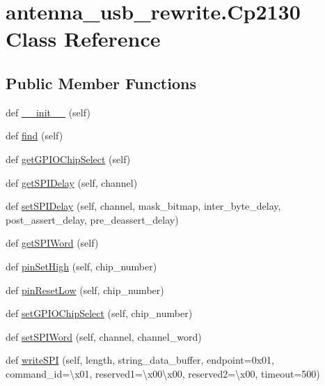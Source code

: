 \hypertarget{classantenna__usb__rewrite_1_1_cp2130}{}\section{antenna\+\_\+usb\+\_\+rewrite.\+Cp2130 Class Reference}
\label{classantenna__usb__rewrite_1_1_cp2130}
\subsection*{Public Member Functions}
\begin{DoxyCompactItemize}
\item 
def \hyperlink{classantenna__usb__rewrite_1_1_cp2130_ad9b0f559ad3acf15619ead6a841b3819}{\+\_\+\+\_\+init\+\_\+\+\_\+} (self)
\item 
def \hyperlink{classantenna__usb__rewrite_1_1_cp2130_aef000907558ea3f8a41eeefe44714b71}{find} (self)
\item 
def \hyperlink{classantenna__usb__rewrite_1_1_cp2130_a0392f11a0df0ea9765ebe864a1e54be5}{get\+G\+P\+I\+O\+Chip\+Select} (self)
\item 
def \hyperlink{classantenna__usb__rewrite_1_1_cp2130_a0710e28b89ee8f720546be8445b03dd4}{get\+S\+P\+I\+Delay} (self, channel)
\item 
def \hyperlink{classantenna__usb__rewrite_1_1_cp2130_a0903382e31257a0ee45510e3687f4d4f}{set\+S\+P\+I\+Delay} (self, channel, mask\+\_\+bitmap, inter\+\_\+byte\+\_\+delay, post\+\_\+assert\+\_\+delay, pre\+\_\+deassert\+\_\+delay)
\item 
def \hyperlink{classantenna__usb__rewrite_1_1_cp2130_a339cdd7e4a1073180be5c65eb9d0972b}{get\+S\+P\+I\+Word} (self)
\item 
def \hyperlink{classantenna__usb__rewrite_1_1_cp2130_a5eb2728116ba0685b7a182808bd2291f}{pin\+Set\+High} (self, chip\+\_\+number)
\item 
def \hyperlink{classantenna__usb__rewrite_1_1_cp2130_aace66727fc61d07305a9473122955cd9}{pin\+Reset\+Low} (self, chip\+\_\+number)
\item 
def \hyperlink{classantenna__usb__rewrite_1_1_cp2130_ae387b1b234ebd317645d61cee53b7f01}{set\+G\+P\+I\+O\+Chip\+Select} (self, chip\+\_\+number)
\item 
def \hyperlink{classantenna__usb__rewrite_1_1_cp2130_a3aea629f83cdbddc124da7e13cd1a148}{set\+S\+P\+I\+Word} (self, channel, channel\+\_\+word)
\item 
def \hyperlink{classantenna__usb__rewrite_1_1_cp2130_ab8f29d3cde366090a6cb64b487136005}{write\+S\+PI} (self, length, string\+\_\+data\+\_\+buffer, endpoint=0x01, command\+\_\+id=\textquotesingle{}\textbackslash{}x01\textquotesingle{}, reserved1=\textquotesingle{}\textbackslash{}x00\textbackslash{}x00\textquotesingle{}, reserved2=\textquotesingle{}\textbackslash{}x00\textquotesingle{}, timeout=500)

\end{DoxyCompactItemize}
